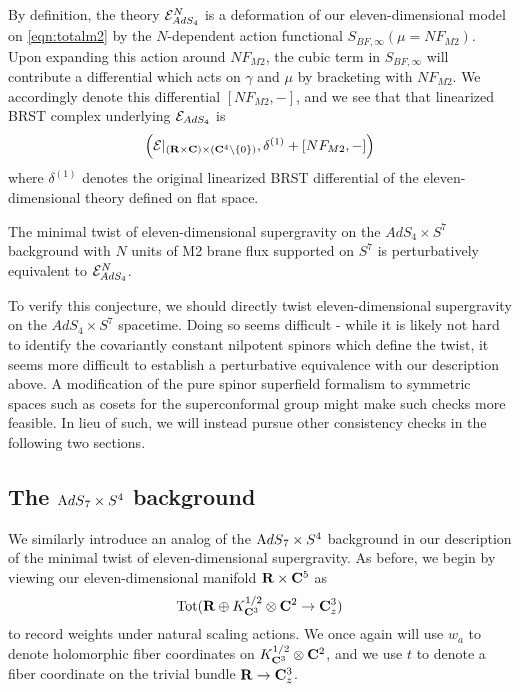 \documentclass[../main.tex]{subfiles}
\begin{document}
\begin{rmk}
By definition, the theory $\mathcal E_{AdS_4}^N$ is a deformation of our eleven-dimensional model on \eqref{eqn:totalm2} by the $N$-dependent action functional $S_{BF, \infty}(\mu = N F_{M2})$.
Upon expanding this action around $NF_{M2}$, the cubic term in $S_{BF,\infty}$ will contribute a differential which acts on $\gamma$ and $\mu$ by bracketing with $NF_{M2}$. We accordingly denote this differential $[NF_{M2}, - ] $, and we see that that linearized BRST complex underlying $\mathcal{E}_{AdS_4}$ is \[\left ( \mathcal{E} |_{(\mathbf{R}\times \mathbf{C})\times (\mathbf{C}^4\setminus \{0\} ) }, \delta^{(1)} + [NF_{M2},-] \right )\] where $\delta^{(1)}$ denotes the original linearized BRST differential of the eleven-dimensional theory defined on flat space.
\end{rmk}

\begin{conj}\label{conj:ads4}
The minimal twist of eleven-dimensional supergravity on the $AdS_4\times S^7$ background with $N$ units of M2 brane flux supported on $S^7$ is perturbatively equivalent to $\mathcal{E}^N_{AdS_4}$.
\end{conj}

To verify this conjecture, we should directly twist eleven-dimensional supergravity on the $AdS_4\times S^7$ spacetime. Doing so seems difficult - while it is likely not hard to identify the covariantly constant nilpotent spinors which define the twist, it seems more difficult to establish a perturbative equivalence with our description above. A modification of the pure spinor superfield formalism to symmetric spaces such as cosets for the superconformal group might make such checks more feasible. In lieu of such, we will instead pursue other consistency checks in the following two sections{}. 

\subsection{The ${\mathrm{A}dS}_7 \times S^4$ background}

We similarly introduce an analog of the ${\mathrm{A}dS}_7 \times S^4$ background in our description of the minimal twist of eleven-dimensional supergravity. As before, we begin by viewing our eleven-dimensional manifold $\mathbf{R}\times \mathbf{C}^5$ as 
\[
\operatorname{Tot}(\mathbf{R} \oplus K_{\mathbf{C}^3}^{1/2}\otimes \mathbf{C}^2 \to \mathbf{C}^3_z)
\]
to record weights under natural scaling actions. We once again will use $w_a$ to denote holomorphic fiber coordinates on $K^{1/2}_{\mathbf{C}^3}\otimes \mathbf{C}^2$, and we use $t$ to denote a fiber coordinate on the trivial bundle $\mathbf{R} \to \mathbf{C}^3_z$.  
\end{document}
